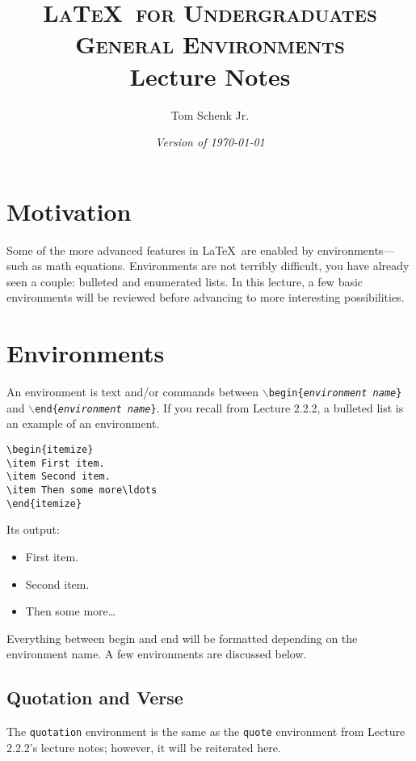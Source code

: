\documentclass{article}
\title{\textsc{\LaTeX\ for Undergraduates\\
			General Environments} \\
			Lecture Notes}
\author{Tom Schenk Jr.}		%
\date{\textit{Version of \today}}
\begin{document}
\maketitle

\section{Motivation}

Some of the more advanced features in \LaTeX\ are enabled by environments---such as math equations. Environments are not terribly difficult, you have already seen a couple: bulleted and enumerated lists. In this lecture, a few basic environments will be reviewed before advancing to more interesting possibilities.

\section{Environments}

An environment is text and/or commands between \texttt{$\backslash$begin\{\textit{environment name}\}} and \texttt{$\backslash$end\{\textit{environment name}\}}. If you recall from Lecture 2.2.2, a bulleted list is an example of an environment.
\begin{verbatim}
\begin{itemize}
\item First item.
\item Second item.
\item Then some more\ldots
\end{itemize}
\end{verbatim}
Its output:
\begin{itemize}
\item First item.
\item Second item.
\item Then some more\ldots
\end{itemize}

Everything between begin and end will be formatted depending on the environment name. A few environments are discussed below.

\subsection{Quotation and Verse}

The \texttt{quotation} environment is the same as the \texttt{quote} environment from Lecture 2.2.2's lecture notes; however, it will be reiterated here.
\end{document}
